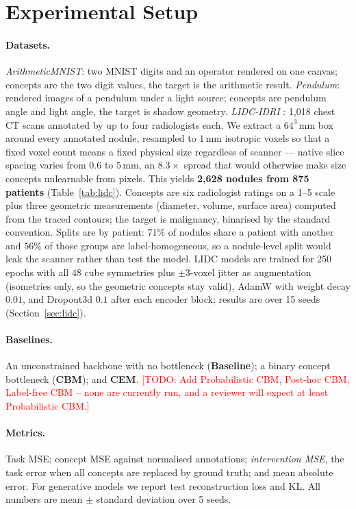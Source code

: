 \documentclass[11pt]{article}
\newcommand{\todo}[1]{\textcolor{red}{[TODO: #1]}}
\begin{document}
\section{Experimental Setup}
\label{sec:setup}

\paragraph{Datasets.}
\emph{ArithmeticMNIST}: two MNIST digits and an operator rendered on one canvas;
concepts are the two digit values, the target is the arithmetic result.
\emph{Pendulum}: rendered images of a pendulum under a light source; concepts
are pendulum angle and light angle, the target is shadow geometry.
\emph{LIDC-IDRI} \citep{armato2011lidc}: 1{,}018 chest CT scans annotated by up
to four radiologists each. We extract a $64^3$\,mm box around every annotated
nodule, resampled to $1$\,mm isotropic voxels so that a fixed voxel count means
a fixed physical size regardless of scanner --- native slice spacing varies
from $0.6$ to $5$\,mm, an $8.3\times$ spread that would otherwise make size
concepts unlearnable from pixels. This yields \textbf{2{,}628 nodules from 875
patients} (Table~\ref{tab:lidc}). Concepts are six radiologist ratings on a
1--5 scale plus three geometric measurements (diameter, volume, surface area)
computed from the traced contours; the target is malignancy, binarised by the
standard convention. Splits are by patient: $71\%$ of nodules share a patient
with another and $56\%$ of those groups are label-homogeneous, so a
nodule-level split would leak the scanner rather than test the model.
LIDC models are trained for 250 epochs with all 48 cube symmetries plus
$\pm 3$-voxel jitter as augmentation (isometries only, so the geometric concepts
stay valid), AdamW with weight decay $0.01$, and Dropout3d $0.1$ after each
encoder block; results are over 15 seeds (Section~\ref{sec:lidc}).

\paragraph{Baselines.}
An unconstrained backbone with no bottleneck (\textbf{Baseline}); a binary
concept bottleneck (\textbf{CBM}); and \textbf{CEM}.
\todo{Add Probabilistic CBM, Post-hoc CBM, Label-free CBM -- none are currently
run, and a reviewer will expect at least Probabilistic CBM.}

\paragraph{Metrics.}
Task MSE; concept MSE against normalised annotations; \emph{intervention MSE},
the task error when all concepts are replaced by ground truth; and mean absolute
error. For generative models we report test reconstruction loss and KL.
All numbers are mean $\pm$ standard deviation over 5 seeds.
\end{document}
